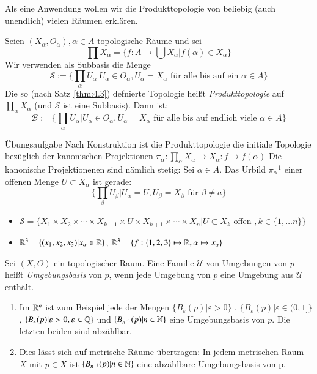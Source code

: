 \documentclass[a4paper,10pt]{scrartcl}
\newcommand{\eps}{\varepsilon}
\renewcommand{\bigsqcap}{\prod}
\begin{document}
Als eine Anwendung wollen wir die Produkttopologie von beliebig (auch unendlich) vielen Räumen erklären.

Seien $(X_\alpha,O_\alpha), \alpha \in A$ topologische Räume und sei
\[
 \bigsqcap X_\alpha=\{f:A\to\bigcup X_\alpha|f(\alpha)\in X_\alpha\}
\]
Wir verwenden als Subbasis die Menge
\[
 \mathcal S:=\{\bigsqcap_\alpha U_\alpha|U_\alpha \in O_\alpha, U_\alpha=X_\alpha \text{ für alle bis auf ein $\alpha \in A$}\}
\]
Die so (nach Satz \ref{thm:4.3}) defnierte Topologie heißt \emph{Produkttopologie} auf $\bigsqcap_\alpha X_\alpha$ (und 
$\mathcal S$ ist eine Subbasis). Dann ist:
\[
 \mathcal B := \{ \bigsqcap_\alpha U_\alpha|U_\alpha\in O_\alpha, U_\alpha=X_\alpha \text{ für alle bis auf endlich viele } \alpha \in A\}
\]
\begin{seg}{Übungsaufgabe}
 Nach Konstruktion ist die Produkttopologie die initiale Topologie bezüglich der kanonischen Projektionen $\pi_\alpha:\bigsqcap_\alpha X_\alpha\to X_\alpha: f\mapsto f(\alpha)$
Die kanonische Projektionenen sind nämlich stetig: Sei $\alpha \in A$. Das Urbild $\pi_\alpha^{-1}$ einer offenen Menge $U\subset X_\alpha$ ist gerade:
\[
 \{\bigsqcap_\beta U_\beta|U_\alpha=U, U_\beta=X_\beta \text{ für } \beta\neq a\}
\]

\end{seg}
\begin{note*}
 \begin{itemize}
  \item $\mathcal S=\{X_1\times X_2\times \dotsb  \times X_{k-1} \times U \times X_{k+1} \times\dotsb \times X_n |U\subset X_k$ offen $, k \in \{1, \dotsc n \} \} $
  \item $\mathbb{R}^3=\{(x_1,x_2,x_3)|x_\alpha\in \mathbb{R}\}$, $\mathbb{R}^3=\{f:\{1,2,3\}\mapsto \mathbb{R}, \alpha\mapsto x_\alpha\}$
 \end{itemize}
\end{note*}
\begin{df}
 Sei $(X,O)$ ein topologischer Raum. Eine Familie $\mathcal U$ von Umgebungen von $p$ heißt \emph{Umgebungsbasis} von $p$, wenn jede Umgebung von $p$ eine Umgebung aus $\mathcal U$ enthält.
\begin{figure}[H]
\centering
 \fixme[fig25]
\caption{}
\end{figure}
\end{df}
\begin{exs*}
 \begin{enumerate}
\item  Im $\mathbb{R}^n$ ist zum Beispiel jede der Mengen $\{B_\eps(p)|\eps>0\}$ , $ \{B_\eps(p)|\eps\in (0,1]\}$, $\{ B_\eps(p)|\eps>0,\eps\in \Q \}$ und $\{B_{n^{-1}}(p)|n\in \mathbb{N}\}$ eine Umgebungsbasis von $p$. Die letzten beiden sind abzählbar.
\item Dies lässt sich auf metrische Räume übertragen: In jedem metrischen Raum $X$ mit $p\in X$ ist $\{B_{n^{-1}}(p)|n\in \mathbb{N}\}$ eine abzählbare Umgebungsbasis von p.
 \end{enumerate}
\end{exs*}
\end{document}
